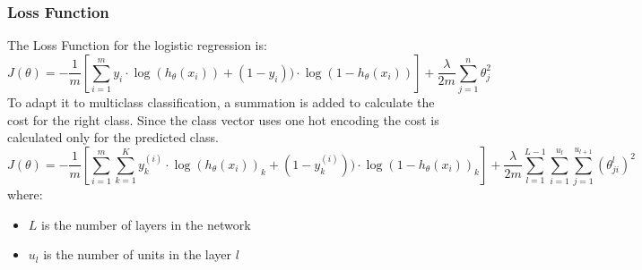 \subsubsection{Loss Function}
The Loss Function for the logistic regression is:
\begin{equation} \tag{Loss Function}
    J(\theta) = -\frac{1}{m} \left[ \sum_{i=1}^m y_i \cdot \log(h_\theta(x_i)) + (1-y_i)) \cdot \log(1-h_\theta(x_i)) \right] + \frac{\lambda}{2m} \sum_{j=1}^n \theta_j^2
\end{equation}
To adapt it to multiclass classification, a summation is added to calculate the cost for the right class.  Since the class vector uses one hot encoding the cost is calculated only for the predicted class.
\begin{equation} \tag{Softmax}
    J(\theta) = -\frac{1}{m} \left[ \sum_{i=1}^m \sum_{k=1}^K y_k^{(i)} \cdot \log(h_\theta(x_i))_k + (1-y_k^{(i)})) \cdot \log(1-h_\theta(x_i))_k \right] + \frac{\lambda}{2m} \sum_{l=1}^{L-1} \sum_{i=1}^{u_l} \sum_{j=1}^{u_{l+1}} (\theta_{ji}^l)^2
\end{equation}
where:
\begin{itemize}
    \item $L$ is the number of layers in the network
    \item $u_l$ is the number of units in the layer $l$
\end{itemize}

\newpage